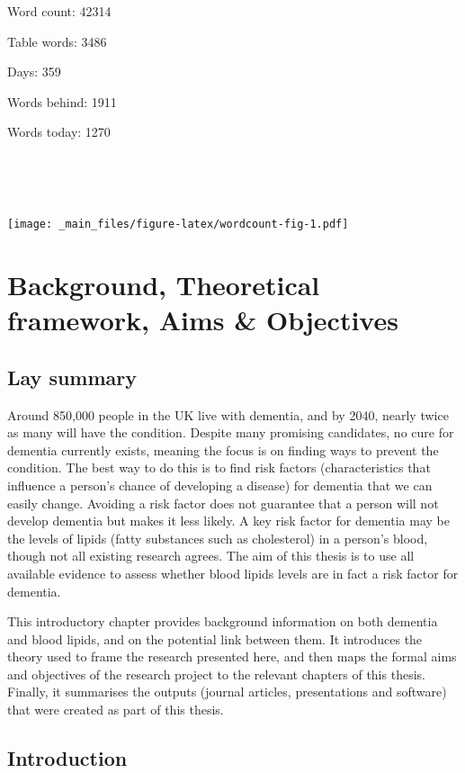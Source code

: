 \documentclass[a4paper, twoside]{templates/ociamthesis}
\begin{document}
\adjustmtc

Word count: 42314

Table words: 3486

Days: 359

Words behind: 1911

Words today: 1270

~

~

\texttt{[image: \_main\_files/figure-latex/wordcount-fig-1.pdf]}



\hypertarget{background-heading}{%
\chapter{Background, Theoretical framework, Aims \& Objectives}\label{background-heading}}

\minitoc 

\hypertarget{lay-summary}{%
\section{Lay summary}\label{lay-summary}}

Around 850,000 people in the UK live with dementia, and by 2040, nearly twice as many will have the condition. Despite many promising candidates, no cure for dementia currently exists, meaning the focus is on finding ways to prevent the condition. The best way to do this is to find risk factors (characteristics that influence a person's chance of developing a disease) for dementia that we can easily change. Avoiding a risk factor does not guarantee that a person will not develop dementia but makes it less likely. A key risk factor for dementia may be the levels of lipids (fatty substances such as cholesterol) in a person's blood, though not all existing research agrees. The aim of this thesis is to use all available evidence to assess whether blood lipids levels are in fact a risk factor for dementia.

This introductory chapter provides background information on both dementia and blood lipids, and on the potential link between them. It introduces the theory used to frame the research presented here, and then maps the formal aims and objectives of the research project to the relevant chapters of this thesis. Finally, it summarises the outputs (journal articles, presentations and software) that were created as part of this thesis.

\hypertarget{introduction}{%
\section{Introduction}\label{introduction}}
\end{document}
